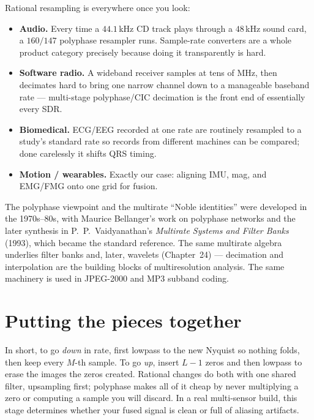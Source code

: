 \begin{applicationbox}
Rational resampling is everywhere once you look:
\begin{itemize}
  \item \textbf{Audio.} Every time a $44.1$\,kHz CD track plays through a $48$\,kHz
  sound card, a $160/147$ polyphase resampler runs. Sample-rate converters are a
  whole product category precisely because doing it transparently is hard.
  \item \textbf{Software radio.} A wideband receiver samples at tens of MHz, then
  decimates hard to bring one narrow channel down to a manageable baseband rate
  --- multi-stage polyphase/CIC decimation is the front end of essentially every
  SDR.
  \item \textbf{Biomedical.} ECG/EEG recorded at one rate are routinely resampled
  to a study's standard rate so records from different machines can be compared;
  done carelessly it shifts QRS timing.
  \item \textbf{Motion / wearables.} Exactly our case: aligning IMU, mag, and
  EMG/FMG onto one grid for fusion.
\end{itemize}
\end{applicationbox}

\begin{historybox}
The polyphase viewpoint and the multirate ``Noble identities'' were developed
in the 1970s--80s, with Maurice Bellanger's work on polyphase networks and the
later synthesis in P.~P.~Vaidyanathan's \emph{Multirate Systems and Filter Banks}
(1993), which became the standard reference. The same multirate algebra underlies
filter banks and, later, wavelets (Chapter~24) --- decimation and
interpolation are the building blocks of multiresolution analysis. The same
machinery is used in JPEG-2000 and MP3 subband coding.
\end{historybox}

\section{Putting the pieces together}
\label{ch22:summary}

In short, to go \emph{down} in
rate, first lowpass to the new Nyquist so nothing folds, then keep every $M$-th
sample. To go \emph{up}, insert $L-1$ zeros and then lowpass to erase the images
the zeros created. Rational changes do both with one shared filter, upsampling
first; polyphase makes all of it cheap by never multiplying a zero or computing a
sample you will discard. In a real multi-sensor build, this stage determines
whether your fused signal is clean or full of aliasing artifacts.


